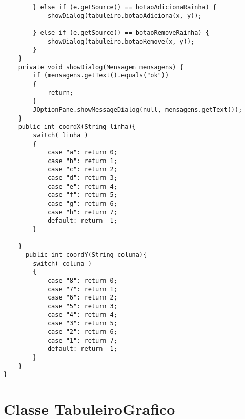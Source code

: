 \begin{lstlisting}
        } else if (e.getSource() == botaoAdicionaRainha) {             
            showDialog(tabuleiro.botaoAdiciona(x, y));

        } else if (e.getSource() == botaoRemoveRainha) {                   
            showDialog(tabuleiro.botaoRemove(x, y));
        }
    }
    private void showDialog(Mensagem mensagens) {
        if (mensagens.getText().equals("ok"))
        {
            return;
        }
        JOptionPane.showMessageDialog(null, mensagens.getText());    
    }
    public int coordX(String linha){
        switch( linha )
        {
            case "a": return 0;
            case "b": return 1;
            case "c": return 2;
            case "d": return 3;
            case "e": return 4;
            case "f": return 5;
            case "g": return 6;
            case "h": return 7;
            default: return -1;
        }    

    }
      public int coordY(String coluna){
        switch( coluna )
        {
            case "8": return 0;
            case "7": return 1;
            case "6": return 2;
            case "5": return 3;
            case "4": return 4;
            case "3": return 5;
            case "2": return 6;
            case "1": return 7;
            default: return -1;
        } 
    }
}
\end{lstlisting}
\newpage
\section{Classe TabuleiroGrafico}

